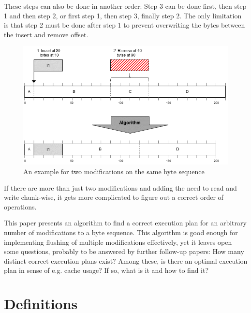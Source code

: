 \documentclass[english, 10pt, openright, twocolumn, landscape, twoside, notitlepage, a4paper, pdftex]		
{article}
\begin{document}
These steps can also be done in another order: Step 3 can be done first, then step 1 and then step 2, or first step 1, then step 3, finally step 2. The only limitation is that step 2 must be done after step 1 to prevent overwriting the bytes between the insert and remove offset.

\begin{figure}[htbp]
\centering
\includegraphics[width=1.00\columnwidth]{figures/Changes.png}
\caption{An example for two modifications on the same byte sequence}
\label{fig:Changes}
\end{figure}

If there are more than just two modifications and adding the need to read and write chunk-wise, it gets more complicated to figure out a correct order of operations.

This paper presents an algorithm to find a correct execution plan for an arbitrary number of modifications to a byte sequence. This algorithm is good enough for implementing flushing of multiple modifications effectively, yet it leaves open some questions, probably to be answered by further follow-up papers: How many distinct correct execution plans exist? Among these, is there an optimal execution plan in sense of e.g. cache usage? If so, what is it and how to find it?

\section{Definitions}%
\label{sec:Definitions}%

\end{document}
